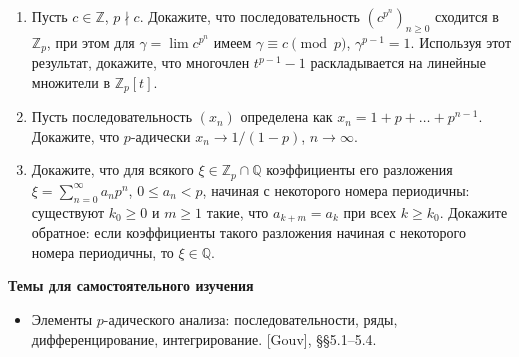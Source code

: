 \documentclass[a4paper, 11pt]{article}
\begin{document}
\begin{enumerate}[topsep=0pt]
    \item Пусть $c \in \mathbb{Z}$, $p \nmid c$. Докажите, что последовательность $(c^{p^n})_{n\ge0}$ сходится в $\mathbb{Z}_p$, при этом для $\gamma = \lim c^{p^n}$ имеем $\gamma \equiv c \pmod{p}$, $\gamma^{p-1}=1$. Используя этот результат, докажите, что многочлен $t^{p-1}-1$ раскладывается на линейные множители в $\mathbb Z_p[t]$.

    \item Пусть последовательность $(x_n)$ определена как $x_n = 1+p+\dots +p^{n-1}$. Докажите, что $p$-адически  $x_n \rightarrow 1/(1-p)$, $n \rightarrow \infty$. %
    
    \item Докажите, что для всякого $\xi\in\mathbb{Z}_p\cap\mathbb{Q}$ коэффициенты его разложения $\xi=\sum_{n=0}^{\infty}a_np^n$, $0\le a_n<p$, начиная с некоторого номера периодичны: существуют $k_0\ge 0$ и $m\ge 1$ такие, что $a_{k+m}=a_k$ при всех $k\ge k_0$. Докажите обратное: если коэффициенты такого разложения начиная с некоторого номера периодичны, то $\xi\in\mathbb{Q}$.
    
\end{enumerate}


        

\noindent\textbf{Темы для самостоятельного изучения}
\begin{itemize}[topsep=0pt]
    \item Элементы $p$-адического анализа: последовательности, ряды, дифференцирование, интегрирование. [Gouv], \S\S 5.1--5.4.
\end{itemize}
\end{document}
